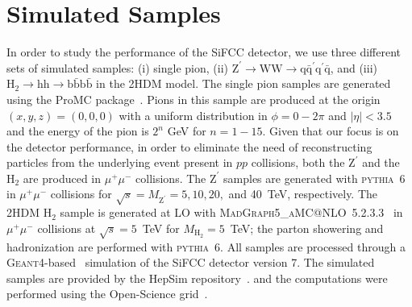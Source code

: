 \documentclass{PoS}
\makeatletter
\newcommand{\PYTHIA} {{\textsc{pythia}}}
\newcommand{\GEANTfour} {{\textsc{Geant4}}}
\newcommand{\MADGRAPHAMC} {\textsc{MadGraph5\_aMC@NLO}}
\makeatother
\begin{document}
\section{Simulated Samples \label{sec:sample}}
In order to study the performance of the SiFCC detector, we use 
three different sets of simulated samples: (i) single pion, (ii) 
$\mathrm{Z}^{\prime}\rightarrow \mathrm{WW} \rightarrow \mathrm{q}\bar{\mathrm{q}}^\prime\mathrm{q^\prime}\bar{\mathrm{q}}$, and (iii) 
$\mathrm{H}_2\rightarrow \mathrm{hh} \rightarrow \mathrm{b}\bar{\mathrm{b}} \mathrm{b}\bar{\mathrm{b}}$ in the 2HDM model. 
% 
The single pion samples are generated using the ProMC 
package~\cite{PROMC}. Pions in this sample are 
produced at the origin $(x,y,z)=(0,0,0)$ with a uniform distribution 
in $\phi=0-2\pi$ and $\left|\eta\right| < 3.5$ and the energy of the pion is 
$2^n$ GeV for $n=1-15$. 
%
Given that our focus is on the detector performance, in order to eliminate 
the need of reconstructing particles from the underlying event present in $pp$ 
collisions, 
both the $\mathrm{Z}^{\prime}$ and the $\mathrm{H}_2$ are produced in 
$\mu^+\mu^-$ collisions. 
The $\mathrm{Z}^{\prime}$ samples are generated with 
\PYTHIA~6~\cite{PYTHIA} in $\mu^+\mu^-$ collisions for 
$\sqrt{s}=M_\mathrm{Z^\prime}=5,10,20,$ and 40~TeV, respectively. 
The 2HDM $\mathrm{H}_2$ sample is generated at LO with 
\MADGRAPHAMC~5.2.3.3~\cite{MADGRAPH} in $\mu^+\mu^-$ collisions at 
$\sqrt{s}=5$~TeV for $M_\mathrm{H_2}=5$~TeV; the parton showering and 
hadronization are performed with \PYTHIA~6. 
%
All samples are processed through a \GEANTfour-based~\cite{GEANT4} simulation 
of the SiFCC detector version 7. 
The simulated samples are provided by the HepSim repository~\cite{hepsim}. 
and the computations were performed using the Open-Science grid~\cite{osg}. 

\end{document}
